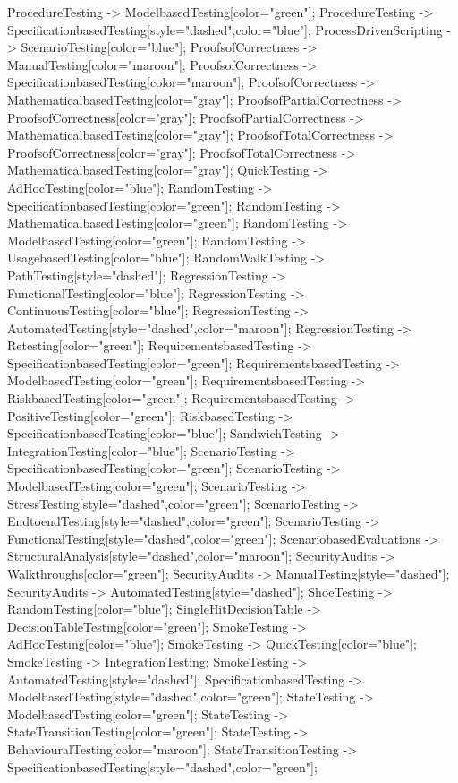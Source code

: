 \documentclass{article}
\begin{document}
{ProcedureTesting -> ModelbasedTesting[color="green"];
ProcedureTesting -> SpecificationbasedTesting[style="dashed",color="blue"];
ProcessDrivenScripting -> ScenarioTesting[color="blue"];
ProofsofCorrectness -> ManualTesting[color="maroon"];
ProofsofCorrectness -> SpecificationbasedTesting[color="maroon"];
ProofsofCorrectness -> MathematicalbasedTesting[color="gray"];
ProofsofPartialCorrectness -> ProofsofCorrectness[color="gray"];
ProofsofPartialCorrectness -> MathematicalbasedTesting[color="gray"];
ProofsofTotalCorrectness -> ProofsofCorrectness[color="gray"];
ProofsofTotalCorrectness -> MathematicalbasedTesting[color="gray"];
QuickTesting -> AdHocTesting[color="blue"];
RandomTesting -> SpecificationbasedTesting[color="green"];
RandomTesting -> MathematicalbasedTesting[color="green"];
RandomTesting -> ModelbasedTesting[color="green"];
RandomTesting -> UsagebasedTesting[color="blue"];
RandomWalkTesting -> PathTesting[style="dashed"];
RegressionTesting -> FunctionalTesting[color="blue"];
RegressionTesting -> ContinuousTesting[color="blue"];
RegressionTesting -> AutomatedTesting[style="dashed",color="maroon"];
RegressionTesting -> Retesting[color="green"];
RequirementsbasedTesting -> SpecificationbasedTesting[color="green"];
RequirementsbasedTesting -> ModelbasedTesting[color="green"];
RequirementsbasedTesting -> RiskbasedTesting[color="green"];
RequirementsbasedTesting -> PositiveTesting[color="green"];
RiskbasedTesting -> SpecificationbasedTesting[color="blue"];
SandwichTesting -> IntegrationTesting[color="blue"];
ScenarioTesting -> SpecificationbasedTesting[color="green"];
ScenarioTesting -> ModelbasedTesting[color="green"];
ScenarioTesting -> StressTesting[style="dashed",color="green"];
ScenarioTesting -> EndtoendTesting[style="dashed",color="green"];
ScenarioTesting -> FunctionalTesting[style="dashed",color="green"];
ScenariobasedEvaluations -> StructuralAnalysis[style="dashed",color="maroon"];
SecurityAudits -> Walkthroughs[color="green"];
SecurityAudits -> ManualTesting[style="dashed"];
SecurityAudits -> AutomatedTesting[style="dashed"];
ShoeTesting -> RandomTesting[color="blue"];
SingleHitDecisionTable -> DecisionTableTesting[color="green"];
SmokeTesting -> AdHocTesting[color="blue"];
SmokeTesting -> QuickTesting[color="blue"];
SmokeTesting -> IntegrationTesting;
SmokeTesting -> AutomatedTesting[style="dashed"];
SpecificationbasedTesting -> ModelbasedTesting[style="dashed",color="green"];
StateTesting -> ModelbasedTesting[color="green"];
StateTesting -> StateTransitionTesting[color="green"];
StateTesting -> BehaviouralTesting[color="maroon"];
StateTransitionTesting -> SpecificationbasedTesting[style="dashed",color="green"];
}
\end{document}
